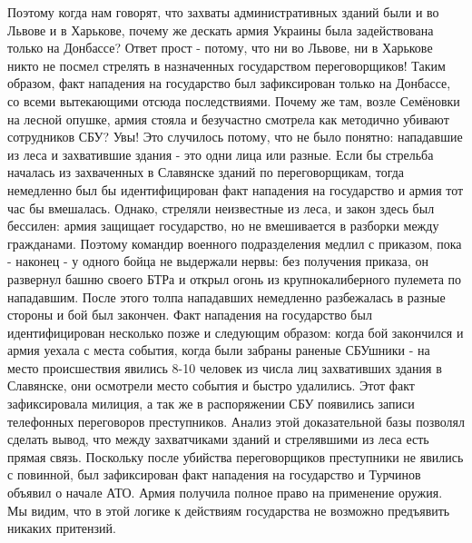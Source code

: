 Поэтому когда нам говорят, что захваты административных зданий были и во Львове и в Харькове, почему же дескать армия Украины была задействована только на Донбассе? Ответ прост - потому, что ни во Львове, ни в Харькове никто не посмел стрелять в назначенных государством переговорщиков!  Таким образом, факт нападения на государство был зафиксирован только на Донбассе, со всеми вытекающими отсюда последствиями.
Почему же там, возле Семёновки на лесной опушке,  армия стояла и безучастно смотрела как методично убивают сотрудников СБУ? Увы! Это случилось потому, что не было понятно: нападавшие из леса и захватившие здания - это одни лица или разные. Если бы стрельба началась из захваченных в Славянске зданий по переговорщикам, тогда немедленно был бы идентифицирован факт нападения на государство и армия тот час бы вмешалась. Однако, стреляли неизвестные из леса, и закон здесь был бессилен: армия защищает государство, но не вмешивается в разборки между гражданами. Поэтому командир военного подразделения медлил с приказом, пока - наконец - у одного бойца не выдержали нервы: без получения приказа, он развернул башню своего БТРа и открыл огонь из крупнокалиберного пулемета по нападавшим. После этого толпа нападавших немедленно разбежалась в разные стороны и бой был закончен.
Факт нападения на государство был идентифицирован несколько позже и следующим образом: когда бой закончился и армия уехала с места события, когда были забраны раненые СБУшники -  на место происшествия явились 8-10 человек из числа лиц захвативших здания в Славянске, они осмотрели место события и быстро удалились. Этот факт зафиксировала милиция, а так же в распоряжении СБУ появились записи телефонных переговоров преступников.  Анализ этой доказательной базы позволял сделать вывод, что между захватчиками зданий и стрелявшими из леса есть прямая связь. 
Поскольку после убийства переговорщиков преступники не явились с повинной, был зафиксирован факт нападения на государство и Турчинов объявил о начале АТО.  Армия получила полное право на применение оружия.
Мы видим, что в этой логике к действиям государства не возможно предъявить никаких притензий.

